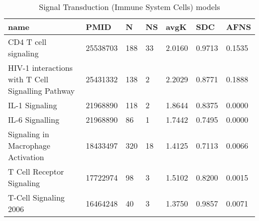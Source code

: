 \begin{table}
\caption{Signal Transduction (Immune System Cells) models}
\label{tab:Signal_Transduction_(Immune_System_Cells)}
\begin{tabular}{|p{180pt}||p{40pt}|p{25pt}|p{25pt}|p{40pt}|p{25pt}|p{25pt}|}
\toprule
name & PMID & N & NS & avgK & SDC & AFNS \\
\midrule
CD4 T cell signaling & 25538703 & 188 & 33 & 2.0160 & 0.9713 & 0.1535 \\
HIV-1 interactions with T Cell Signalling Pathway & 25431332 & 138 & 2 & 2.2029 & 0.8771 & 0.1888 \\
IL-1 Signaling & 21968890 & 118 & 2 & 1.8644 & 0.8375 & 0.0000 \\
IL-6 Signalling & 21968890 & 86 & 1 & 1.7442 & 0.7495 & 0.0000 \\
Signaling in Macrophage Activation & 18433497 & 320 & 18 & 1.4125 & 0.7113 & 0.0066 \\
T Cell Receptor Signaling & 17722974 & 98 & 3 & 1.5102 & 0.8200 & 0.0015 \\
T-Cell Signaling 2006 & 16464248 & 40 & 3 & 1.3750 & 0.9857 & 0.0071 \\
\bottomrule
\end{tabular}
\end{table}
